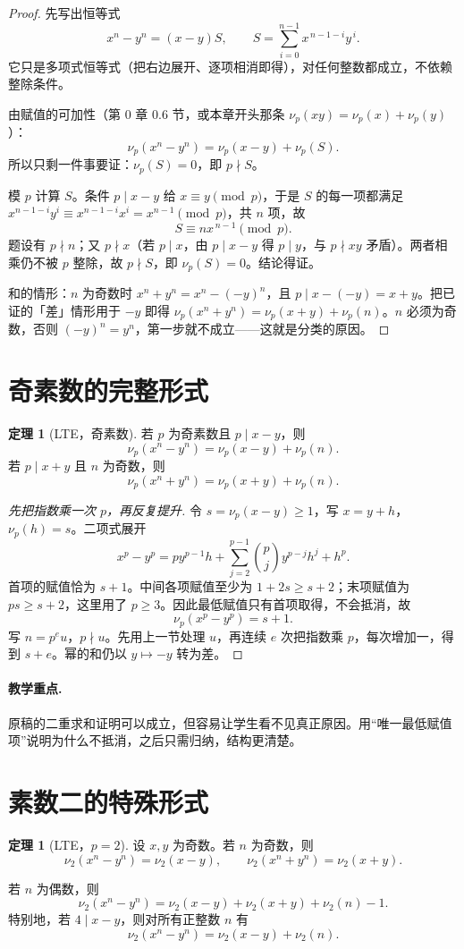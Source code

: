 \documentclass[UTF8,a4paper,11pt,oneside,openany,fontset=fandol]{ctexbook}
\theoremstyle{definition}
\newtheorem{theorem}[definition]{定理}
\begin{document}
\begin{proof}
先写出恒等式
\[
 x^n-y^n=(x-y)S,\qquad S=\sum_{i=0}^{n-1}x^{\,n-1-i}y^{\,i}.
\]
它只是多项式恒等式（把右边展开、逐项相消即得），对任何整数都成立，不依赖整除条件。

由赋值的可加性（第 0 章 0.6 节，或本章开头那条 $\nu_p(xy)=\nu_p(x)+\nu_p(y)$）：
\[
 \nu_p(x^n-y^n)=\nu_p(x-y)+\nu_p(S).
\]
所以只剩一件事要证：$\nu_p(S)=0$，即 $p\nmid S$。

模 $p$ 计算 $S$。条件 $p\mid x-y$ 给 $x\equiv y\pmod p$，于是 $S$ 的每一项都满足 $x^{n-1-i}y^{i}\equiv x^{n-1-i}x^{i}=x^{n-1}\pmod p$，共 $n$ 项，故
\[
 S\equiv n x^{\,n-1}\pmod p.
\]
题设有 $p\nmid n$；又 $p\nmid x$（若 $p\mid x$，由 $p\mid x-y$ 得 $p\mid y$，与 $p\nmid xy$ 矛盾）。两者相乘仍不被 $p$ 整除，故 $p\nmid S$，即 $\nu_p(S)=0$。结论得证。

和的情形：$n$ 为奇数时 $x^n+y^n=x^n-(-y)^n$，且 $p\mid x-(-y)=x+y$。把已证的「差」情形用于 $-y$ 即得
$\nu_p(x^n+y^n)=\nu_p(x+y)+\nu_p(n)$。$n$ 必须为奇数，否则 $(-y)^n=y^n$，第一步就不成立——这就是分类的原因。
\end{proof}

\section{奇素数的完整形式}
\begin{theorem}[LTE，奇素数]
若 $p$ 为奇素数且 $p\mid x-y$，则
\[
 \nu_p(x^n-y^n)=\nu_p(x-y)+\nu_p(n).
\]
若 $p\mid x+y$ 且 $n$ 为奇数，则
\[
 \nu_p(x^n+y^n)=\nu_p(x+y)+\nu_p(n).
\]
\end{theorem}

\begin{proof}[先把指数乘一次 $p$，再反复提升]
令 $s=\nu_p(x-y)\ge1$，写 $x=y+h$，$\nu_p(h)=s$。二项式展开
\[
 x^p-y^p=py^{p-1}h+\sum_{j=2}^{p-1}\binom pj y^{p-j}h^j+h^p.
\]
首项的赋值恰为 $s+1$。中间各项赋值至少为 $1+2s\ge s+2$；末项赋值为 $ps\ge s+2$，这里用了 $p\ge3$。因此最低赋值只有首项取得，不会抵消，故
\[
\nu_p(x^p-y^p)=s+1.
\]
写 $n=p^e u$，$p\nmid u$。先用上一节处理 $u$，再连续 $e$ 次把指数乘 $p$，每次增加一，得到 $s+e$。幂的和仍以 $y\mapsto-y$ 转为差。
\end{proof}
\paragraph{教学重点.} 原稿的二重求和证明可以成立，但容易让学生看不见真正原因。用“唯一最低赋值项”说明为什么不抵消，之后只需归纳，结构更清楚。


\section{素数二的特殊形式}
\begin{theorem}[LTE，$p=2$]
设 $x,y$ 为奇数。若 $n$ 为奇数，则
\[
 \nu_2(x^n-y^n)=\nu_2(x-y),\qquad
 \nu_2(x^n+y^n)=\nu_2(x+y).
\]


若 $n$ 为偶数，则
\[
 \nu_2(x^n-y^n)=\nu_2(x-y)+\nu_2(x+y)+\nu_2(n)-1.
\]
特别地，若 $4\mid x-y$，则对所有正整数 $n$ 有
\[
 \nu_2(x^n-y^n)=\nu_2(x-y)+\nu_2(n).
\]
\end{theorem}
\end{document}
